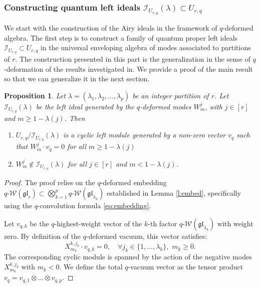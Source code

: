 \documentclass[reqno,11pt]{amsart}
\theoremstyle{plain}
\newtheorem{proposition}[theorem]{Proposition}
\theoremstyle{definition}
\theoremstyle{remark}
\numberwithin{equation}{section}
\newcommand{\1}{\mathds{1}}
\newcommand{\2}{\frac{1}{2}}
\begin{document}
{				\subsubsection{ {Constructing quantum left ideals $\mathcal{I}_{U_{r,q}}(\lambda) \subset U_{r,q}$}}
				{We start with the construction of the Airy ideals in the framework of $q$-deformed algebra. The first step is to construct a family of  quantum proper left ideals $\mathcal{I}_{U_{r,q}} \subset U_{r,q}$ in the universal enveloping algebra of modes associated to partitions of $r$. The construction presented in this part is the generalization in the sense of $q$-deformation of the results investigated in\cite{BBCCN18}. We provide a proof of the main result so that we can generalize it in the next section.}
				
				\begin{proposition}\label{p:leftideals}
					Let $\lambda = (\lambda_1, \lambda_2, \ldots, \lambda_p)$ be an integer partition of $r$. 
					Let $\mathcal{I}_{U_{r,q}}(\lambda)$ be the left ideal generated by the $q$-deformed modes $W^j_m$, with $j \in [r]$ and $m \geq1- \lambda(j)$. Then 
					\begin{enumerate}
						\item[(a)]
						$U_{r,q} / \mathcal{I}_{U_{r,q}}(\lambda)$ is a cyclic left module generated by a non-zero vector $v_q$ such that $W^j_m \cdot v_q=0$ for all $m \geq1- \lambda(j)$ \item[(b)] 
						$W^j_m \notin \mathcal{I}_{U_{r,q}}(\lambda)$ for all  $j \in [r]$ and $m < 1- \lambda(j)$.
					\end{enumerate}
				\end{proposition}
	
				\begin{proof}
					{The proof relies on the $q$-deformed embedding $q\text{-}\mathcal{W}(\mathfrak{gl}_r) \subset \bigotimes_{k=1}^p q\text{-}\mathcal{W}(\mathfrak{gl}_{\lambda_k})$ established in Lemma \ref{l:embed}, specifically using the $q$-convolution formula \eqref{eq:embedding}.}
					
					{Let $v_{q,k}$ be the $q$-highest-weight vector of the $k$-th factor $q\text{-}\mathcal{W}(\mathfrak{gl}_{\lambda_k})$ with weight zero. By definition of the $q$-deformed vacuum, this vector satisfies:
						\begin{equation}
							X^{k,j_k}_{m_k} \cdot v_{q,k} = 0, \quad \forall j_k \in \{1, \dots, \lambda_k\}, \,\, m_k \geq 0.
						\end{equation}
						The corresponding cyclic module is spanned by the action of the negative modes $X^{k,j_k}_{m_k}$ with $m_k < 0$. We define the total $q$-vacuum vector as the tensor product $v_q = v_{q,1} \otimes \dots \otimes v_{q,p}$.}
					

\end{proof}}
\end{document}
